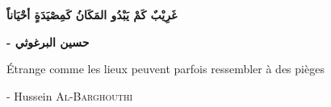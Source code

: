 \chapter*{}
\vfill
\begin{center}
    \begin{otherlanguage}{arabic}
        \begin{RLtext}
            \bfseries غَرِيْبٌ كَمْ يَبْدُو المَكَانُ كَمِصْيَدَةٍ أحْيَاناً 
            
            \bfseries - حسين البرغوثي  
    \end{RLtext}
        \thispagestyle{empty}
    \end{otherlanguage}
    \begin{otherlanguage}{arabic}
        \begin{RLtext}
    \end{RLtext}
    \end{otherlanguage}
    \vspace*{0.1cm}
    {\selectfont Étrange comme les lieux peuvent parfois ressembler à des pièges}
    
    {\selectfont - Hussein \scshape Al-Barghouthi}
\end{center}
\vfill